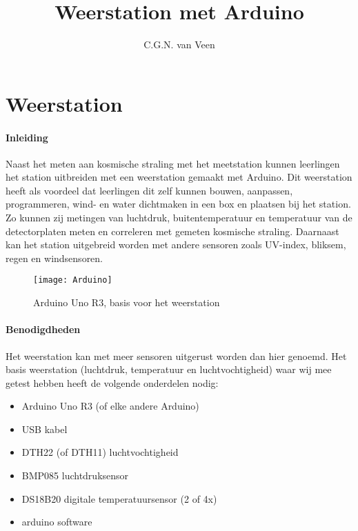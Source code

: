 

\makeatletter
\global\let\tikz@ensure@dollar@catcode=\relax
\makeatother

\title{Weerstation met Arduino}
\author{C.G.N. van Veen}



\maketitle

\section{Weerstation}

\paragraph{Inleiding}
Naast het meten aan kosmische straling met het \hisparc meetstation kunnen
leerlingen het \hisparc station uitbreiden met een weerstation gemaakt met Arduino.
Dit weerstation heeft als voordeel dat leerlingen dit zelf kunnen bouwen, aanpassen,
programmeren, wind- en water dichtmaken in een box en plaatsen bij het station.
Zo kunnen zij metingen van luchtdruk, buitentemperatuur en temperatuur van de
detectorplaten meten en correleren met gemeten kosmische straling. Daarnaast
kan het station uitgebreid worden met andere sensoren zoals UV-index, bliksem,
regen en windsensoren.

\begin{figure}
    \centering
    \texttt{[image: Arduino]}
    \caption{Arduino Uno R3, basis voor het weerstation}
   \label{fig:Arduino}
\end{figure}

\paragraph{Benodigdheden}
Het weerstation kan met meer sensoren uitgerust worden dan hier genoemd.
Het basis weerstation (luchtdruk, temperatuur en luchtvochtigheid) waar wij mee
getest hebben heeft de volgende onderdelen nodig:

\begin{itemize}
    \item Arduino Uno R3 (of elke andere Arduino)
    \item USB kabel
    \item DTH22 (of DTH11) luchtvochtigheid
    \item BMP085 luchtdruksensor
    \item DS18B20 digitale temperatuursensor (2 of 4x)
    \item arduino software
\end{itemize}

